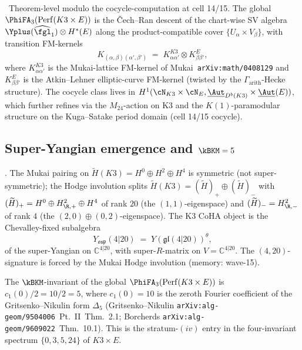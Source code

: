 \begin{theorem}
\label{thm:k3xe-global-phi-fa-3}
\textup{\ClaimStatusConjectured\ Theorem-level modulo the
cocycle-computation at cell 14/15.} The global
$\PhiFA_3(\mathrm{Perf}(K3 \times E))$ is the Čech--Ran descent of
the chart-wise SV algebra $\Yplus(\widehat{\fgl}_1) \otimes H^\ast(E)$
along the product-compatible cover $\{U_\alpha \times V_\beta\}$,
with transition FM-kernels
\[
  K_{(\alpha,\beta)(\alpha',\beta')} \;=\;
  K^{K3}_{\alpha\alpha'} \otimes K^E_{\beta\beta'},
\]
where $K^{K3}_{\alpha\alpha'}$ is the Mukai-lattice FM-kernel of
Mukai~\texttt{arXiv:math/0408129} and $K^E_{\beta\beta'}$ is the
Atkin--Lehner elliptic-curve FM-kernel (twisted by the
$\Gamma_{\mathrm{arith}}$-Hecke structure). The cocycle class lives
in $H^1(\cN_{K3} \times \cN_E,
\underline{\Aut}_{D^b(K3)} \times \underline{\Aut}(E))$, which further
refines via the $M_{24}$-action on K3 and the $K(1)$-paramodular
structure on the Kuga--Satake period domain (cell 14/15 cocycle).
\end{theorem}

\subsection*{Super-Yangian emergence and $\kBKM = 5$}

\begin{proposition}
\label{prop:super-yangian-k3xe}
\textup{\ClaimStatusConjectured.} The Mukai pairing on
$\widetilde{H}(K3) = H^0 \oplus H^2 \oplus H^4$ is symmetric
(not super-symmetric); the Hodge involution splits
$\widetilde{H}(K3) = (\widetilde H)_+ \oplus (\widetilde H)_-$ with
$(\widetilde H)_+ = H^0 \oplus H^2_{\R, +} \oplus H^4$ of rank $20$
(the $(1,1)$-eigenspace) and $(\widetilde H)_- = H^2_{\R, -}$ of
rank $4$ (the $(2,0) \oplus (0,2)$-eigenspace). The K3 CoHA object
is the Chevalley-fixed subalgebra
\[
  Y_{\mathfrak{osp}}(4|20) \;=\;
  Y(\mathfrak{gl}(4|20))^\theta,
\]
of the super-Yangian on $\mathbb{C}^{4|20}$, with super-$R$-matrix
on $V = \mathbb{C}^{4|20}$. The $(4, 20)$-signature is forced by the
Mukai Hodge involution (memory: wave-15).
\end{proposition}

\begin{corollary}
\label{cor:kbkm-5-global}
The $\kBKM$-invariant of the global
$\PhiFA_3(\mathrm{Perf}(K3 \times E))$ is
$c_1(0) / 2 = 10 / 2 = 5$, where $c_1(0) = 10$ is the zeroth Fourier
coefficient of the Gritsenko--Nikulin form $\Delta_5$
(Gritsenko--Nikulin \texttt{arXiv:alg-geom/9504006}~Pt.~II~Thm.~2.1;
Borcherds \texttt{arXiv:alg-geom/9609022}~Thm.~10.1). This is the
stratum-$(iv)$ entry in the four-invariant spectrum
$\{0, 3, 5, 24\}$ of $K3 \times E$.
\end{corollary}

